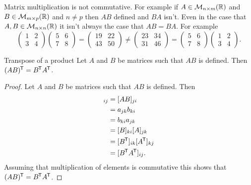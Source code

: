 \documentclass[a4paper]{article}
\newcommand{\nxmMatrices}[3]{\mathcal{M}_{{#1}\times{#2}}({#3})}
\begin{document}
    Matrix multiplication is not commutative.
    For example if \(A\in\nxmMatrices{n}{m}{\reals}\) and \(B\in\nxmMatrices{m}{p}{\reals}\) and \(n \ne p\) then \(AB\) defined and \(BA\) isn't.
    Even in the case that \(A, B \in \nxmMatrices{n}{n}{\reals}\) it isn't always the case that \(AB = BA\).
    For example
    \[
        \begin{pmatrix}
            1 & 2\\
            3 & 4
        \end{pmatrix}
        \begin{pmatrix}
            5 & 6\\
            7 & 8
        \end{pmatrix}
        =
        \begin{pmatrix}
            19 & 22\\
            43 & 50
        \end{pmatrix}
        \ne
        \begin{pmatrix}
            23 & 34\\
            31 & 46
        \end{pmatrix}
        =
        \begin{pmatrix}
            5 & 6\\
            7 & 8
        \end{pmatrix}
        \begin{pmatrix}
            1 & 2\\
            3 & 4
        \end{pmatrix}
        .
    \]
    \begin{lemma}{Transpose of a product}{}
        Let \(A\) and \(B\) be matrices such that \(AB\) is defined.
        Then \((AB)^{\mkern-1.5mu\mathsf{T}} = B^{\mkern-1.5mu\mathsf{T}} A^{\mkern-1.5mu\mathsf{T}}\).
    \end{lemma}
    \begin{proof}
        Let \(A\) and \(B\) be matrices such that \(AB\) is defined.
        Then
        \begin{align*}
            [(AB)\trans]_{ij} &= [AB]_{ji}\\
            &= a_{jk}b_{ki}\\
            &= b_{ki}a_{jk}\\
            &= [B]_{ki}[A]_{jk}\\
            &= [B\trans]_{ik}[A\trans]_{kj}\\
            &= [B\trans A\trans]_{ij}.
        \end{align*}
        Assuming that multiplication of elements is commutative this shows that \((AB)^{\mkern-1.5mu\mathsf{T}} = B^{\mkern-1.5mu\mathsf{T}} A^{\mkern-1.5mu\mathsf{T}}\).
    \end{proof}
    
\end{document}
